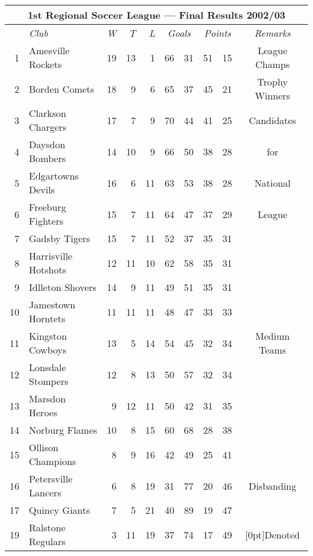 \documentclass{article}
\begin{document}
\begin{tabular}{|r|l||rrr|r@{:}l|r@{:}l||c|}\hline
  \multicolumn{10}{|c|}{\rule[-3mm]{0mm}{8mm}\bfseries 1st Regional Soccer
        League --- Final Results 2002/03} \\ \hline
   &\itshape Club &\itshape W &\itshape T &\itshape L
     & \multicolumn{2}{c|}{\itshape Goals} 
     & \multicolumn{2}{c|}{\itshape Points}
     & \itshape Remarks \\ \hline\hline
 1 & Amesville Rockets & 19 & 13 &  1 & 66&31 & 51&15 & League Champs \\ \hline
 2 & Borden Comets     & 18 &  9 &  6 & 65&37 & 45&21 & Trophy Winners\\ \hline
 3 & Clarkson Chargers & 17 &  7 &  9 & 70&44 & 41&25 & Candidates\\ \cline{1-9}
 4 & Daysdon Bombers   & 14 & 10 &  9 & 66&50 & 38&28 & for       \\ \cline{1-9}
 5 & Edgartowns Devils & 16 &  6 & 11 & 63&53 & 38&28 & National  \\ \cline{1-9}
 6 & Freeburg Fighters & 15 &  7 & 11 & 64&47 & 37&29 & League    \\ \hline
 7 & Gadsby Tigers     & 15 &  7 & 11 & 52&37 & 35&31 &           \\ \cline{1-9}
 8 & Harrisville Hotshots& 12&11 & 10 & 62&58 & 35&31 &           \\ \cline{1-9}
 9 & Idlleton Shovers  & 14 &  9 & 11 & 49&51 & 35&31 &           \\ \cline{1-9}
10 & Jamestown Horntets& 11 & 11 & 11 & 48&47 & 33&33 &           \\ \cline{1-9}
11 & Kingston Cowboys  & 13 &  5 & 14 & 54&45 & 32&34&Medium Teams\\ \cline{1-9}
12 & Lonsdale Stompers & 12 &  8 & 13 & 50&57 & 32&34 &           \\ \cline{1-9}
13 & Marsdon Heroes    &  9 & 12 & 11 & 50&42 & 31&35 &           \\ \cline{1-9}
14 & Norburg Flames    & 10 &  8 & 15 & 60&68 & 28&38 &           \\ \cline{1-9}
15 & Ollison Champions &  8 &  9 & 16 & 42&49 & 25&41 &           \\ \hline
16 & Petersville Lancers& 6 &  8 & 19 & 31&77 & 20&46 & Disbanding\\ \hline
17 & Quincy Giants     &  7 &  5 & 21 & 40&89 & 19&47 &           \\ \cline{1-9}
19 & Ralstone Regulars &  3 & 11 & 19 & 37&74 & 17&49 & 
     \raisebox{1.5ex}[0pt]{Denoted} \\ \hline
\end{tabular}
\end{document}
